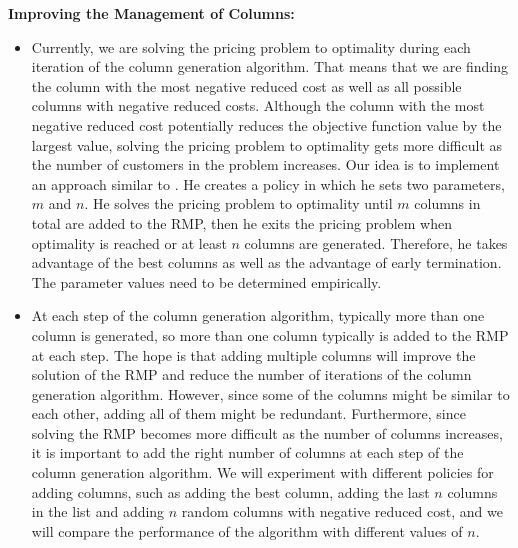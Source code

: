 \begin{enumerate}
  {\bf Improving the Management of Columns:}
  \begin{itemize}
  \item Currently, we are solving the pricing problem to optimality during each 
    iteration of the column generation algorithm. That means that we are finding 
    the column with the most negative reduced cost as well as all possible columns 
    with negative reduced costs. Although the column with the most negative reduced 
    cost potentially reduces the objective function value by the largest value,  
    solving the pricing problem to optimality gets more difficult as the number of 
    customers in the problem increases. 
    Our idea is to implement an approach similar to \citet{Larsen}. He creates a policy 
    in which he sets two parameters, $m$ and $n$. He solves the pricing  problem to 
    optimality until $m$ columns in total are added to the RMP, then he exits the pricing 
    problem when optimality is reached or at least $n$ columns are generated. Therefore, 
    he takes advantage of the best columns as well as the advantage of early termination. 
    The parameter values need to be determined empirically. 

  \item At each step of the column generation algorithm, typically more than one column is
    generated, so more than one column typically is added to the RMP at each step.
    The hope is that adding multiple columns will improve the solution 
    of the RMP and reduce the number of iterations of the column generation algorithm.
    However, since some of the columns might be similar to each other,  
    adding all of them might be redundant. Furthermore, since solving the RMP becomes
    more difficult as the number of columns increases, it is important
    to add the right number of columns at each step of the column generation
    algorithm. We will experiment with different policies for adding columns, 
    such as adding the best column, adding the last $n$ columns in the list and 
    adding $n$ random columns with negative reduced cost, and we will
    compare the performance of the algorithm with different values of $n$.  


\end{itemize}
\end{enumerate}
